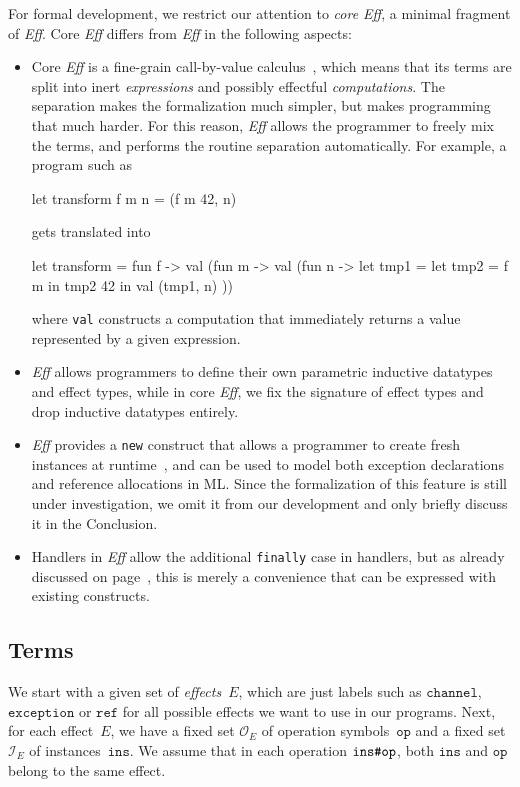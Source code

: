 \documentclass{LMCS}
\newcommand{\kord}[1]{\mathtt{#1}}
\newcommand{\hash}[2]{#1\text{\texttt{\char35}}#2}
\newcommand{\op}{\mathtt{op}}
\newcommand{\inst}{\mathtt{ins}}
\newcommand{\ops}{\mathcal{O}}
\newcommand{\insts}{\mathcal{I}}
\newcommand{\Eff}{\emph{Eff}\xspace}
\let\inline\lstinline
\begin{document}
For formal development,
we restrict our attention to \emph{core \Eff}, a minimal fragment of \Eff.
Core \Eff differs from \Eff in the following aspects:
\begin{itemize}
  \item
    Core \Eff is a fine-grain call-by-value calculus~\cite{levy03modelling},
    which means that its terms are split into
    inert \emph{expressions} and possibly effectful \emph{computations}.
    The separation makes the formalization much simpler,
    but makes programming that much harder.
    For this reason, \Eff allows the programmer to freely mix the terms,
    and performs the routine separation automatically.
    For example, a program such as
\begin{source}
  let transform f m n = (f m 42, n)
    \end{source}
gets translated into\enlargethispage{\baselineskip}
    \begin{source}
  let transform = fun f -> val (fun m -> val (fun n ->
    let tmp1 =
      let tmp2 = f m in
      tmp2 42
    in
    val (tmp1, n)
  ))
    \end{source}
    where \inline{val} constructs a computation that immediately returns
    a value represented by a given expression.
  \item
    \Eff allows programmers to define their own parametric inductive datatypes and effect types,
    while in core \Eff, we fix the signature of effect types and drop inductive datatypes entirely.
  \item
    \Eff provides a \inline{new} construct
    that allows a programmer to create fresh instances at runtime~\cite{bauer2012programming},
    and can be used to model both exception declarations and reference allocations in ML.
    Since the formalization of this feature is still under investigation, we omit it from our development
    and only briefly discuss it in the Conclusion.
  \item
    Handlers in \Eff allow the additional \inline{finally} case in handlers,
    but as already discussed on page~\pageref{page:finally},
    this is merely a convenience that can be expressed with existing constructs.
\end{itemize}

\subsection{Terms}

We start with a given set of \emph{effects}~$E$,
which are just labels such as $\kord{channel}$, $\kord{exception}$ or $\kord{ref}$
for all possible effects we want to use in our programs.
Next, for each effect~$E$, we have a fixed set $\ops_E$ of operation symbols~$\op$
and a fixed set $\insts_E$ of instances~$\inst$.
We assume that in each operation $\hash{\inst}{\op}$,
both $\inst$ and $\op$ belong to the same effect.
\end{document}
